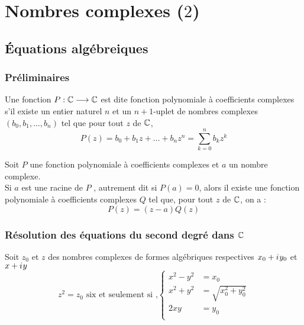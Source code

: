 \chapter{Nombres complexes (\(2\))}

\minitoc

\section{Équations algébreiques}
\subsection{Préliminaires}
\begin{defi}
    Une fonction \(P:\mathbb{C}\longrightarrow\mathbb{C}\) est dite fonction polynomiale à coefficients complexes s'il existe un entier naturel \(n\) et un \(n+1\)-uplet de nombres complexes \((b_0,b_1,\dots,b_n)\) tel que pour tout \(z\) de \(\mathbb{C}\), 
    \[P(z) = b_0+b_1z+\dots+b_nz^n = \sum_{k=0}^n b_k z^k\]
\end{defi}
\begin{prop}
    Soit \(P\) une fonction polynomiale à coefficients complexes et \(a\) un nombre complexe.\\
    Si \(a\) est une racine de \(P\) , autrement dit si \(P (a) = 0\), alors il existe une fonction polynomiale à coefficients complexes \(Q\) tel que, pour tout \(z\) de \(\mathbb{C}\), on a :
    \[P(z) = (z-a)Q(z)\]
\end{prop}

\subsection{Résolution des équations du second degré dans \(\mathbb{C}\)}
\begin{defprop} [cas particulier des équations du type \(z^2 = z_0\)]
    Soit \(z_0\) et \(z\) des nombres complexes de formes algébriques respectives \(x_0 + i\mkern1mu y_0\) et \(x+i\mkern1mu y\) 
    \[z^2 = z_0 \text{ six et seulement si ,} 
    \begin{cases}
        x^2-y^2 &= x_0 \\
        x^2+y^2 &= \sqrt{x_0^2 + y_0^2}\\
        2xy &= y_0 \\
    \end{cases}
    \]
\end{defprop}

